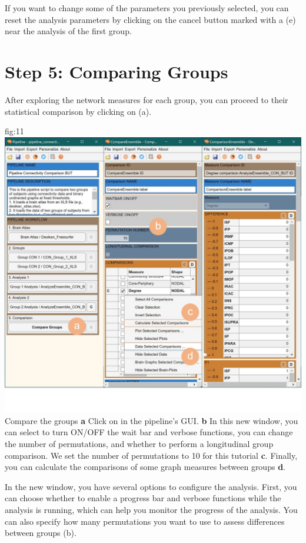 \documentclass[justified]{tufte-handout}
\begin{document}
	
If you want to change some of the parameters you previously selected, you can reset the analysis parameters by clicking on the cancel button marked with a  (e) near the analysis of the first group.
 
\clearpage
\section{Step 5: Comparing Groups}

After exploring the network measures for each group, you can proceed to their statistical comparison by clicking on  (a).

{fig:11}
{
	\includegraphics{fig11.jpg}
}
{Compare the groups}
{
	{\bf a} Click on  in the pipeline's GUI.
	{\bf b} In this new window, you can select to turn ON/OFF the wait bar and verbose functions, you can change the number of permutations, and whether to perform a longitudinal group comparison. We set the number of permutations to 10 for this tutorial {\bf c}. Finally, you can calculate the comparisons of some graph measures between groups {\bf d}.
}

	
In the new window, you have several options to configure the analysis. First, you can choose whether to enable a progress bar and verbose functions while the analysis is running, which can help you monitor the progress of the analysis. You can also specify how many permutations you want to use to assess differences between groups (b).
\end{document}
